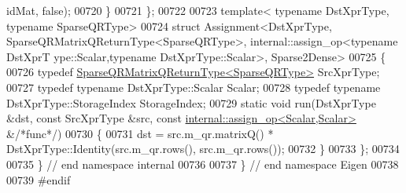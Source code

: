\begin{DoxyCode}
      idMat, \textcolor{keyword}{false});
00720   \}
00721 \};
00722 
00723 \textcolor{keyword}{template}< \textcolor{keyword}{typename} DstXprType, \textcolor{keyword}{typename} SparseQRType>
00724 \textcolor{keyword}{struct }Assignment<DstXprType, SparseQRMatrixQReturnType<SparseQRType>, internal::assign\_op<typename DstXprT
      ype::Scalar,typename DstXprType::Scalar>, Sparse2Dense>
00725 \{
00726   \textcolor{keyword}{typedef} \hyperlink{struct_eigen_1_1_sparse_q_r_matrix_q_return_type}{SparseQRMatrixQReturnType<SparseQRType>} SrcXprType;
00727   \textcolor{keyword}{typedef} \textcolor{keyword}{typename} DstXprType::Scalar Scalar;
00728   \textcolor{keyword}{typedef} \textcolor{keyword}{typename} DstXprType::StorageIndex StorageIndex;
00729   \textcolor{keyword}{static} \textcolor{keywordtype}{void} run(DstXprType &dst, \textcolor{keyword}{const} SrcXprType &src, \textcolor{keyword}{const} 
      \hyperlink{struct_eigen_1_1internal_1_1assign__op}{internal::assign\_op<Scalar,Scalar>} &\textcolor{comment}{/*func*/})
00730   \{
00731     dst = src.m\_qr.matrixQ() * DstXprType::Identity(src.m\_qr.rows(), src.m\_qr.rows());
00732   \}
00733 \};
00734 
00735 \} \textcolor{comment}{// end namespace internal}
00736 
00737 \} \textcolor{comment}{// end namespace Eigen}
00738 
00739 \textcolor{preprocessor}{#endif}
\end{DoxyCode}
